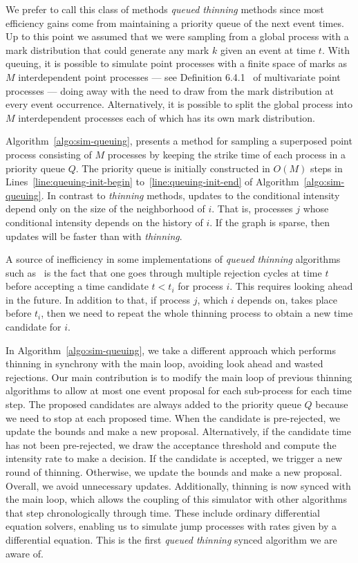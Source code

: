 \documentclass{juliacon}
\numberwithin{equation}{section}
\begin{document}
We prefer to call this class of methods \textit{queued thinning} methods since most efficiency gains come from maintaining a priority queue of the next event times. Up to this point we assumed that we were sampling from a global process with a mark distribution that could generate any mark \( k \) given an event at time \( t \). With queuing, it is possible to simulate point processes with a finite space of marks as \( M \) interdependent point processes --- see Definition 6.4.1~\cite{daley2003} of multivariate point processes --- doing away with the need to draw from the mark distribution at every event occurrence. Alternatively, it is possible to split the global process into \( M \) interdependent processes each of which has its own mark distribution.

Algorithm~\ref{algo:sim-queuing}, presents a method for sampling a superposed point process consisting of \( M \) processes by keeping the strike time of each process in a priority queue \( Q \). The priority queue is initially constructed in \( O(M) \) steps in Lines~\ref{line:queuing-init-begin} to~\ref{line:queuing-init-end} of Algorithm~\ref{algo:sim-queuing}. In contrast to \textit{thinning} methods, updates to the conditional intensity depend only on the size of the neighborhood of \( i \). That is, processes \( j \) whose conditional intensity depends on the history of \( i \). If the graph is sparse, then updates will be faster than with \textit{thinning}.

A source of inefficiency in some implementations of \textit{queued thinning} algorithms such as~\cite{farajtabar2017} is the fact that one goes through multiple rejection cycles at time \( t \) before accepting a time candidate \( t < t_i \) for process \( i \). This requires looking ahead in the future. In addition to that, if process \( j \), which \( i \) depends on, takes place before \( t_i \), then we need to repeat the whole thinning process to obtain a new time candidate for \( i \).

In Algorithm~\ref{algo:sim-queuing}, we take a different approach which performs thinning in synchrony with the main loop, avoiding look ahead and wasted rejections. Our main contribution is to modify the main loop of previous thinning algorithms to allow at most one event proposal for each sub-process for each time step. The proposed candidates are always added to the priority queue \( Q \) because we need to stop at each proposed time. When the candidate is pre-rejected, we update the bounds and make a new proposal. Alternatively, if the candidate time has not been pre-rejected, we draw the acceptance threshold and compute the intensity rate to make a decision. If the candidate is accepted, we trigger a new round of thinning. Otherwise, we update the bounds and make a new proposal. Overall, we avoid unnecessary updates. Additionally, thinning is now synced with the main loop, which allows the coupling of this simulator with other algorithms that step chronologically through time. These include ordinary differential equation solvers, enabling us to simulate jump processes with rates given by a differential equation. This is the first \textit{queued thinning} synced algorithm we are aware of.
\end{document}
